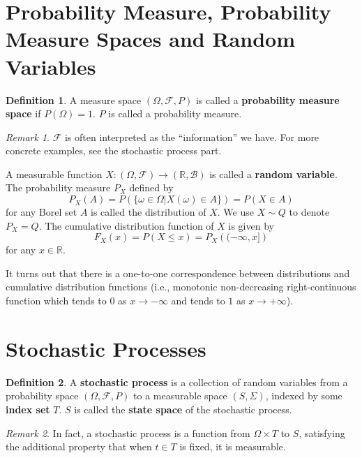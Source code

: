 \documentclass[openany]{book}
\theoremstyle{definition}
\newtheorem{definition}{Definition}[chapter]
\theoremstyle{remark}
\newtheorem*{remark}{Remark}
\begin{document}
\section{Probability Measure, Probability Measure Spaces and Random Variables}
\begin{definition}
    A measure space $(\Omega,\mathcal{F},P)$ is called a \textbf{probability measure space} if $P(\Omega)=1$. $P$ is called a probability measure.
\end{definition}
\begin{remark}
    $\mathcal{F}$ is often interpreted as the ``information'' we have. For more concrete examples, see the stochastic process part.
\end{remark}
A measurable function $X:(\Omega,\mathcal{F})\rightarrow(\mathbb{R},\mathcal{B})$ is called a \textbf{random variable}. The probability measure $P_X$ defined by
\begin{equation*}
    P_X(A)=P\left(\{\omega\in\Omega|X(\omega)\in A\}\right)=P(X\in A)
\end{equation*}
for any Borel set $A$ is called the distribution of $X$. We use $X\sim Q$ to denote $P_X=Q$. The cumulative distribution function of $X$ is given by
\begin{equation*}
    F_X(x)=P(X\le x)=P_X\left((-\infty,x]\right)
\end{equation*}
for any $x\in \mathbb{R}$.

It turns out that there is a one-to-one correspondence between distributions and cumulative distribution functions (i.e., monotonic non-decreasing right-continuous function which tends to 0 as $x\to-\infty$ and tends to $1$ as $x\to+\infty$).

\section{Stochastic Processes}
\begin{definition}
    A \textbf{stochastic process} is a collection of random variables from a probability space $(\Omega,\mathcal{F},P)$ to a measurable space $(S,\Sigma)$, indexed by some \textbf{index set} $T$. $S$ is called the \textbf{state space} of the stochastic process.
\end{definition}
\begin{remark}
    In fact, a stochastic process is a function from $\Omega\times T$ to $S$, satisfying the additional property that when $t\in T$ is fixed, it is measurable.
\end{remark}
\end{document}
